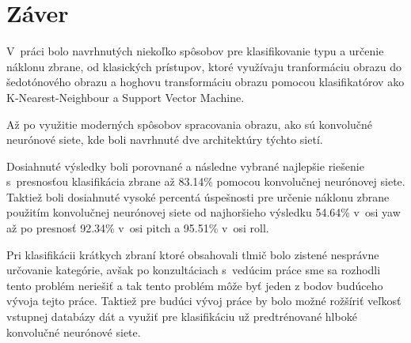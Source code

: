 
\chapter{Záver}

V~práci bolo navrhnutých niekoľko spôsobov pre klasifikovanie typu a určenie náklonu zbrane, od klasických prístupov,
    ktoré využívaju tranformáciu obrazu do šedotónového obrazu a hoghovu transformáciu obrazu pomocou
    klasifikatórov ako K-Nearest-Neighbour a Support Vector Machine.

Až po využitie moderných spôsobov spracovania obrazu, ako sú konvolučné neurónové siete, kde boli navrhnuté
    dve architektúry týchto sietí.

Dosiahnuté výsledky boli porovnané a následne vybrané najlepšie riešenie s~presnosťou klasifikácia zbrane až 83.14\%
    pomocou konvolučnej neurónovej siete.
Taktiež boli dosiahnuté vysoké percentá úspešnosti pre určenie náklonu zbrane použitím konvolučnej neurónovej siete od
    najhoršieho výsledku 54.64\% v~osi yaw až po presnosť 92.34\% v~osi pitch a 95.51\% v~osi roll.

Pri klasifikácii krátkych zbraní ktoré obsahovali tlmič bolo zistené nesprávne určovanie kategórie, avšak po
    konzultáciach s~vedúcim práce sme sa rozhodli tento problém neriešiť a tak tento problém môže byť jeden z bodov
    budúceho vývoja tejto práce.
Taktiež pre budúci vývoj práce by bolo možné rožšíriť veľkosť vstupnej databázy dát a využiť pre klasifikáciu
    už predtrénované hlboké konvolučné neurónové siete.
